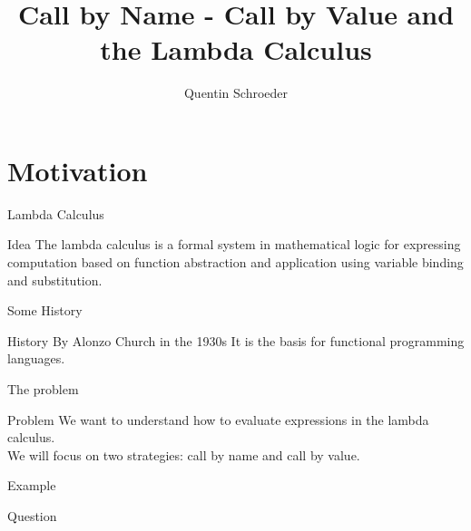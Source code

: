 \documentclass[10pt]{beamer}
\title{Call by Name - Call by Value and the Lambda Calculus}
\date{}
\author{Quentin Schroeder}
\institute{MPRI - Université Paris-Cité}
\begin{document}
\maketitle


\section[Idea]{Motivation}


\begin{frame}[fragile]{Lambda Calculus}
  \begin{alertblock}{Idea}
    The lambda calculus is a formal system in mathematical logic for expressing computation based on function abstraction and application using variable binding and substitution.\\
  \end{alertblock}

\end{frame}

\begin{frame}[fragile]{Some History}
  \begin{alertblock}{History}
    By Alonzo Church in the 1930s %
    It is the basis for functional programming languages.\\
  \end{alertblock}

\end{frame}



\begin{frame}[fragile]{The problem}
  \begin{alertblock}{Problem}
    We want to understand how to evaluate expressions in the lambda calculus.\\
    We will focus on two strategies: call by name and call by value.\\
  \end{alertblock}

  \pause

  \begin{alertblock}{Example}

  \end{alertblock}

  \begin{alertblock}{Question}

  \end{alertblock}
\end{frame}
\end{document}
